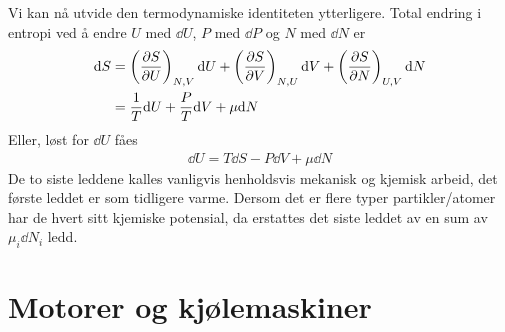 \documentclass[12pt]{article}
\begin{document}
Vi kan nå utvide den termodynamiske identiteten ytterligere. Total endring i entropi
ved å endre $U$ med $\dd U$, $P$ med $\dd P$ og $N$ med $\dd N$ er
\begin{align*}
  \dd S &= \left( \pdv{S}{U} \right)_{N, V} \dd U + \left( \pdv{S}{V} \right)_{N, U} \dd V + \left( \pdv{S}{N} \right)_{U, V} \dd N\\
        &= \frac{1}{T} \dd U + \frac{P}{T} \dd V + \mu \dd N
\end{align*}
Eller, løst for $\dd U$ fåes
\begin{align*}
  \dd U = T \dd S - P \dd V + \mu \dd N
\end{align*}
De to siste leddene kalles vanligvis henholdsvis mekanisk og kjemisk arbeid, det
første leddet er som tidligere varme. Dersom det er flere typer partikler/atomer
har de hvert sitt kjemiske potensial, da erstattes det siste leddet av en sum
av $\mu_i \dd N_i$ ledd.
\section{Motorer og kjølemaskiner}
\end{document}
